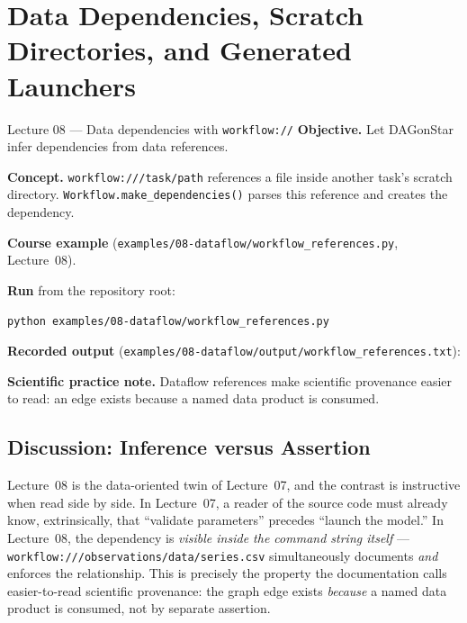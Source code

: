 \chapter{Data Dependencies, Scratch Directories, and Generated Launchers}
\label{ch:lessons-03-04}

\begin{lessonbox}{Lecture 08 --- Data dependencies with \texttt{workflow://}}
\textbf{Objective.} Let DAGonStar infer dependencies from data references.

\textbf{Concept.} \texttt{workflow:///task/path} references a file inside
another task's scratch directory. \texttt{Workflow.make\_dependencies()}
parses this reference and creates the dependency.

\textbf{Course example} (\texttt{examples/08-dataflow/workflow\_references.py}, Lecture~08).


\textbf{Run} from the repository root:
\begin{lstlisting}[style=bash]
python examples/08-dataflow/workflow_references.py
\end{lstlisting}

\textbf{Recorded output} (\texttt{examples/08-dataflow/output/workflow\_references.txt}):


\textbf{Scientific practice note.} Dataflow references make scientific
provenance easier to read: an edge exists because a named data product is
consumed.
\end{lessonbox}

\section{Discussion: Inference versus Assertion}

Lecture~08 is the data-oriented twin of Lecture~07, and the contrast is
instructive when read side by side. In Lecture~07, a reader of the source code
must already know, extrinsically, that ``validate parameters'' precedes
``launch the model.'' In Lecture~08, the dependency is \emph{visible inside the
command string itself} --- \texttt{workflow:///observations/data/series.csv}
simultaneously documents \emph{and} enforces the relationship. This is
precisely the property the documentation calls easier-to-read scientific
provenance: the graph edge exists \emph{because} a named data product is
consumed, not by separate assertion.

